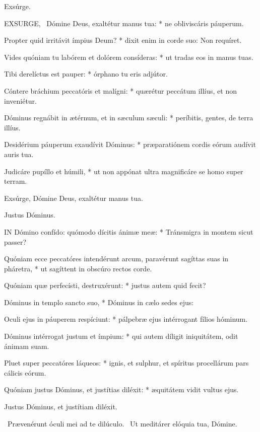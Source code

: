  Exsúrge. \textdagger


\lettrine[lines=2]{E}{XSURGE}, \textdagger\ Dómine Deus, exaltétur manus tua: * ne obliviscáris páuperum.

Propter quid irritávit ímpius Deum? * dixit enim in corde suo: Non requíret.

Vides quóniam tu labórem et dolórem consíderas: * ut tradas eos in manus tuas.

Tibi derelíctus est pauper: * órphano tu eris adjútor.

Cóntere bráchium peccatóris et malígni: * quærétur peccátum illíus, et non inveniétur.

Dóminus regnábit in ætérnum, et in sæculum sæculi: * períbitis, gentes, de terra illíus.

Desidérium páuperum exaudívit Dóminus: * præparatiónem cordis eórum audívit auris tua.

Judicáre pupíllo et húmili, * ut non appónat ultra magnificáre se homo super terram.

 Exsúrge, Dómine Deus, exaltétur manus tua.

 Justus Dóminus.


\lettrine[lines=2]{I}{N} Dómino confído: quómodo dícitis ánimæ meæ: * Tránsmigra in montem sicut passer?

Quóniam ecce peccatóres intendérunt arcum, paravérunt sagíttas suas in pháretra, * ut sagíttent in obscúro rectos corde.

Quóniam quæ perfecísti, destruxérunt: * justus autem quid fecit?

Dóminus in templo sancto suo, * Dóminus in cælo sedes ejus:

Oculi ejus in páuperem respíciunt: * pálpebræ ejus intérrogant fílios hóminum.

Dóminus intérrogat justum et ímpium: * qui autem díligit iniquitátem, odit ánimam suam.

Pluet super peccatóres láqueos: * ignis, et sulphur, et spíritus procellárum pars cálicis eórum.

Quóniam justus Dóminus, et justítias diléxit: * æquitátem vidit vultus ejus.

 Justus Dóminus, et justítiam diléxit.

\V\ Prævenérunt óculi mei ad te dilúculo. \R\ Ut meditárer elóquia tua, Dómine.

